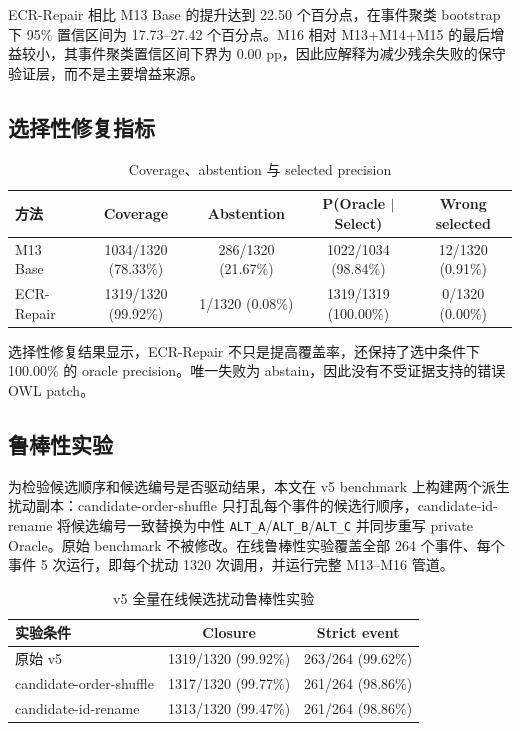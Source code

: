 \documentclass[11pt]{article}
\begin{document}
ECR-Repair 相比 M13 Base 的提升达到 22.50 个百分点，在事件聚类 bootstrap 下 95\% 置信区间为 17.73--27.42 个百分点。M16 相对 M13+M14+M15 的最后增益较小，其事件聚类置信区间下界为 0.00 pp，因此应解释为减少残余失败的保守验证层，而不是主要增益来源。

\subsection{选择性修复指标}

\begin{table}[t]
\centering
\caption{Coverage、abstention 与 selected precision}
\label{tab:selective}
\begin{tabular}{lcccc}
\toprule
方法 & Coverage & Abstention & P(Oracle $\mid$ Select) & Wrong selected \\
\midrule
M13 Base & 1034/1320 (78.33\%) & 286/1320 (21.67\%) & 1022/1034 (98.84\%) & 12/1320 (0.91\%) \\
ECR-Repair & 1319/1320 (99.92\%) & 1/1320 (0.08\%) & 1319/1319 (100.00\%) & 0/1320 (0.00\%) \\
\bottomrule
\end{tabular}
\end{table}

选择性修复结果显示，ECR-Repair 不只是提高覆盖率，还保持了选中条件下 100.00\% 的 oracle precision。唯一失败为 abstain，因此没有不受证据支持的错误 OWL patch。

\subsection{鲁棒性实验}

为检验候选顺序和候选编号是否驱动结果，本文在 v5 benchmark 上构建两个派生扰动副本：candidate-order-shuffle 只打乱每个事件的候选行顺序，candidate-id-rename 将候选编号一致替换为中性 \texttt{ALT\_A}/\texttt{ALT\_B}/\texttt{ALT\_C} 并同步重写 private Oracle。原始 benchmark 不被修改。在线鲁棒性实验覆盖全部 264 个事件、每个事件 5 次运行，即每个扰动 1320 次调用，并运行完整 M13--M16 管道。

\begin{table}[t]
\centering
\caption{v5 全量在线候选扰动鲁棒性实验}
\label{tab:online-robustness}
\begin{tabular}{lcc}
\toprule
实验条件 & Closure & Strict event \\
\midrule
原始 v5 & 1319/1320 (99.92\%) & 263/264 (99.62\%) \\
candidate-order-shuffle & 1317/1320 (99.77\%) & 261/264 (98.86\%) \\
candidate-id-rename & 1313/1320 (99.47\%) & 261/264 (98.86\%) \\
\bottomrule
\end{tabular}
\end{table}
\end{document}

